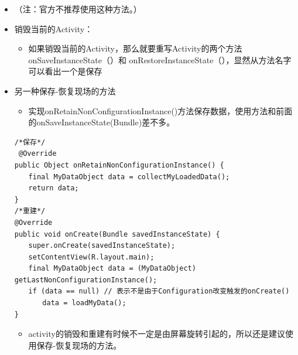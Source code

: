 \documentclass[9pt, b5paper]{article}
\begin{document}
\begin{itemize}
\item （注：官方不推荐使用这种方法。）
\item 销毁当前的Activity：
\begin{itemize}
\item 如果销毁当前的Activity，那么就要重写Activity的两个方法onSaveInstanceState（）和 onRestoreInstanceState（），显然从方法名字可以看出一个是保存
\end{itemize}
\item 另一种保存-恢复现场的方法
\begin{itemize}
\item 实现onRetainNonConfigurationInstance()方法保存数据，使用方法和前面的onSaveInstanceState(Bundle)差不多。
\end{itemize}
\begin{verbatim}
/*保存*/
 @Override 
public Object onRetainNonConfigurationInstance() { 
　　final MyDataObject data = collectMyLoadedData(); 
　　return data; 
} 
/*重建*/
@Override 
public void onCreate(Bundle savedInstanceState) { 
　　super.onCreate(savedInstanceState); 
　　setContentView(R.layout.main); 
　　final MyDataObject data = (MyDataObject) getLastNonConfigurationInstance(); 
　　if (data == null) // 表示不是由于Configuration改变触发的onCreate() 
　　　　data = loadMyData(); 
}
\end{verbatim}
\begin{itemize}
\item activity的销毁和重建有时候不一定是由屏幕旋转引起的，所以还是建议使用保存-恢复现场的方法。
\end{itemize}
\end{itemize}
\end{document}

